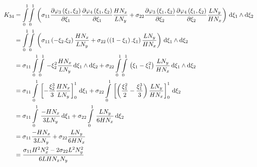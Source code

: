 \begin{equation}
  \begin{aligned}
    K_{34}&=\giint{0}{1}{0}{1}{\pbrac{\sigma_{11}\delby{\lbfn{3}{\xi_{1},\xi_{2}}}{\xi_{1}}\delby{\lbfn{4}{\xi_{1},\xi_{2}}}{\xi_{1}}
        \dfrac{H N_{x}}{L N_{y}}+\sigma_{22}\delby{\lbfn{3}{\xi_{1},\xi_{2}}}{\xi_{2}}\delby{\lbfn{4}{\xi_{1},\xi_{2}}}{\xi_{2}}
        \dfrac{L N_{y}}{H N_{x}}}}{\xi_{1}}{\xi_{2}}\\
    &=\giint{0}{1}{0}{1}{\pbrac{\sigma_{11}\pbrac{-\xi_{2}.\xi_{2}}\dfrac{H N_{x}}{L N_{y}}+
    \sigma_{22}\pbrac{\pbrac{1-\xi_{1}}.\xi_{1}}\dfrac{L N_{y}}{H N_{x}}}}{\xi_{1}}{\xi_{2}} \\
    &=\sigma_{11}\giint{0}{1}{0}{1}{-\xi_{2}^{2}\dfrac{H N_{x}}{L N_{y}}}{\xi_{1}}{\xi_{2}}+
    \sigma_{22}\giint{0}{1}{0}{1}{\pbrac{\xi_{1}-\xi_{1}^{2}}\dfrac{L N_{y}}{H N_{x}}}{\xi_{1}}{\xi_{2}} \\
    &=\sigma_{11}\gint{0}{1}{\sqbrac{-\dfrac{\xi_{2}^{3}}{3}\dfrac{H N_{x}}{L N_{y}}}_{0}^{1}}{\xi_{1}}+
    \sigma_{22}\gint{0}{1}{\sqbrac{\pbrac{\dfrac{\xi_{1}^{2}}{2}-\dfrac{\xi_{1}^{3}}{3}}\dfrac{L N_{y}}{H N_{x}}}_{0}^{1}}{\xi_{2}} \\
    &=\sigma_{11}\gint{0}{1}{\dfrac{-H N_{x}}{3 L N_{y}}}{\xi_{1}}+\sigma_{22}\gint{0}{1}{\dfrac{L N_{y}}{6 H N_{x}}}{\xi_{2}} \\
    &=\sigma_{11}\dfrac{-H N_{x}}{3 L N_{y}}+\sigma_{22}\dfrac{L N_{y}}{6 H N_{x}} \\
    &=\dfrac{\sigma_{11}H^{2}N_{x}^{2}-2 \sigma_{22}L^{2}N_{y}^{2}}{6 L H N_{x} N_{y}}
  \end{aligned}
\end{equation}

